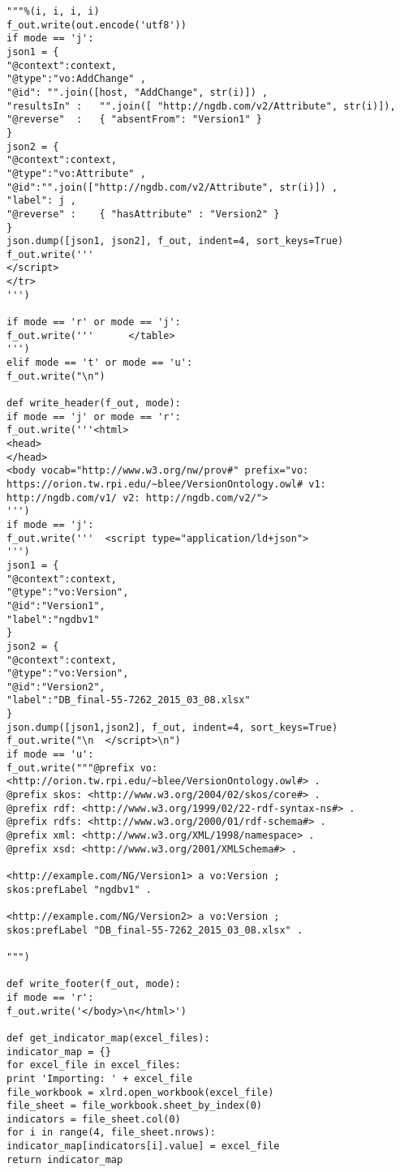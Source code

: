 \begin{verbatim}
"""%(i, i, i, i)
f_out.write(out.encode('utf8'))
if mode == 'j':
json1 = {
"@context":context,
"@type":"vo:AddChange" ,
"@id": "".join([host, "AddChange", str(i)]) ,
"resultsIn" :   "".join([ "http://ngdb.com/v2/Attribute", str(i)]),
"@reverse"  :   { "absentFrom": "Version1" }
}
json2 = {
"@context":context,
"@type":"vo:Attribute" ,
"@id":"".join(["http://ngdb.com/v2/Attribute", str(i)]) ,
"label": j ,
"@reverse" :    { "hasAttribute" : "Version2" }
}
json.dump([json1, json2], f_out, indent=4, sort_keys=True)
f_out.write('''
</script>
</tr>
''')

if mode == 'r' or mode == 'j':
f_out.write('''      </table>
''')
elif mode == 't' or mode == 'u':
f_out.write("\n")

def write_header(f_out, mode):
if mode == 'j' or mode == 'r':
f_out.write('''<html>
<head>
</head>
<body vocab="http://www.w3.org/nw/prov#" prefix="vo: https://orion.tw.rpi.edu/~blee/VersionOntology.owl# v1: http://ngdb.com/v1/ v2: http://ngdb.com/v2/">
''')
if mode == 'j':
f_out.write('''  <script type="application/ld+json">
''')
json1 = {
"@context":context,
"@type":"vo:Version",
"@id":"Version1",
"label":"ngdbv1"
}
json2 = {
"@context":context,
"@type":"vo:Version",
"@id":"Version2",
"label":"DB_final-55-7262_2015_03_08.xlsx"
}
json.dump([json1,json2], f_out, indent=4, sort_keys=True)
f_out.write("\n  </script>\n")
if mode == 'u':
f_out.write("""@prefix vo: <http://orion.tw.rpi.edu/~blee/VersionOntology.owl#> .
@prefix skos: <http://www.w3.org/2004/02/skos/core#> .
@prefix rdf: <http://www.w3.org/1999/02/22-rdf-syntax-ns#> .
@prefix rdfs: <http://www.w3.org/2000/01/rdf-schema#> .
@prefix xml: <http://www.w3.org/XML/1998/namespace> .
@prefix xsd: <http://www.w3.org/2001/XMLSchema#> .

<http://example.com/NG/Version1> a vo:Version ;
skos:prefLabel "ngdbv1" .

<http://example.com/NG/Version2> a vo:Version ;
skos:prefLabel "DB_final-55-7262_2015_03_08.xlsx" .

""")

def write_footer(f_out, mode):
if mode == 'r':
f_out.write('</body>\n</html>')

def get_indicator_map(excel_files):
indicator_map = {}
for excel_file in excel_files:
print 'Importing: ' + excel_file
file_workbook = xlrd.open_workbook(excel_file)
file_sheet = file_workbook.sheet_by_index(0)
indicators = file_sheet.col(0)
for i in range(4, file_sheet.nrows):
indicator_map[indicators[i].value] = excel_file
return indicator_map


\end{verbatim}
